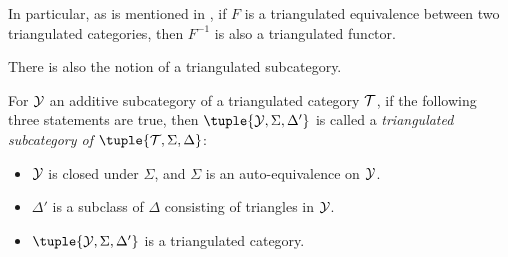 In particular, as is mentioned in \cite[p.4 Lemma]{Happel_1988}, if \( F \) is a triangulated equivalence between two triangulated categories, then \( F^{-1} \) is also a triangulated functor.

There is also the notion of a triangulated subcategory.
\begin{definition}
    For \( {\mathcal{Y}} \) an additive subcategory of a triangulated category \( {\mathcal{T}} \), if the following three statements are true, then \( \tuple{\Yc, \Sigma, \Delta'} \) is called a \emph{triangulated subcategory of \( \tuple{\Tc, \Sigma, \Delta} \)}:
    \begin{itemize}
        \item {
            \( {\mathcal{Y}} \) is closed under \( \Sigma \), and \( \Sigma \) is an auto-equivalence on \( {\mathcal{Y}} \).
        }
        \item {
            \( \Delta' \) is a subclass of \( \Delta \) consisting of triangles in \( {\mathcal{Y}} \).
        }
        \item {
            \( \tuple{\Yc, \Sigma, \Delta'} \) is a triangulated category.
        }
    \end{itemize}
\end{definition}
